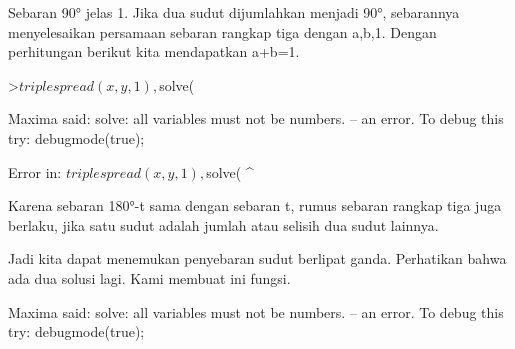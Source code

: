 \documentclass[a4paper,10pt]{article}
\begin{document}
\begin{eulernotebook}
\begin{eulercomment}
\begin{eulercomment}
\begin{eulercomment}
\begin{eulercomment}
\begin{eulercomment}
\begin{eulercomment}
\begin{eulercomment}
\begin{eulercomment}
\begin{eulercomment}
\begin{eulercomment}
\begin{eulercomment}
\begin{eulercomment}
\begin{eulercomment}
\begin{eulercomment}
\begin{eulercomment}
\begin{eulercomment}
\begin{eulercomment}
Sebaran 90° jelas 1. Jika dua sudut dijumlahkan menjadi 90°,
sebarannya menyelesaikan persamaan sebaran rangkap tiga dengan a,b,1.
Dengan perhitungan berikut kita mendapatkan a+b=1.
\end{eulercomment}
\begin{eulerprompt}
>$triplespread(x,y,1), $solve(%
\end{eulerprompt}
\begin{euleroutput}
  Maxima said:
  solve: all variables must not be numbers.
   -- an error. To debug this try: debugmode(true);
  
  Error in:
   $triplespread(x,y,1), $solve(%
                                   ^
\end{euleroutput}
\begin{eulercomment}
Karena sebaran 180°-t sama dengan sebaran t, rumus sebaran rangkap
tiga juga berlaku, jika satu sudut adalah jumlah atau selisih dua
sudut lainnya.

Jadi kita dapat menemukan penyebaran sudut berlipat ganda. Perhatikan
bahwa ada dua solusi lagi. Kami membuat ini fungsi.
\end{eulercomment}
\begin{euleroutput}
  Maxima said:
  solve: all variables must not be numbers.
   -- an error. To debug this try: debugmode(true);
  

\end{euleroutput}
\end{eulercomment}
\end{eulercomment}
\end{eulercomment}
\end{eulercomment}
\end{eulercomment}
\end{eulercomment}
\end{eulercomment}
\end{eulercomment}
\end{eulercomment}
\end{eulercomment}
\end{eulercomment}
\end{eulercomment}
\end{eulercomment}
\end{eulercomment}
\end{eulercomment}
\end{eulercomment}
\end{eulernotebook}
\end{document}
